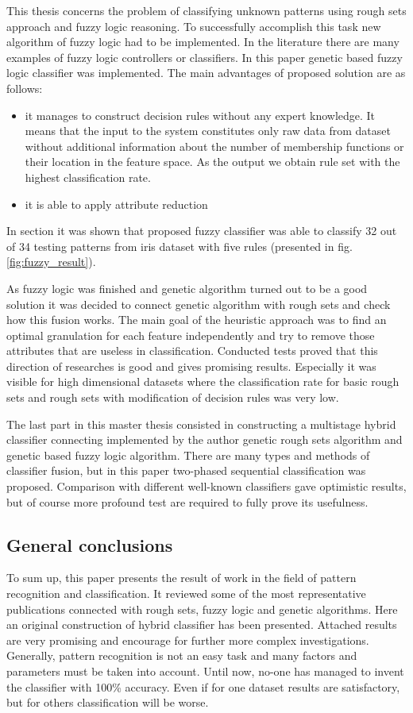 This thesis concerns the problem of classifying unknown patterns using rough
sets approach and fuzzy logic reasoning. To successfully accomplish this task
new algorithm of fuzzy logic had to be implemented. In the literature there are
many examples of fuzzy logic controllers or classifiers. In this paper genetic
based fuzzy logic classifier was implemented. The main advantages of proposed
solution are as follows:
\begin{itemize}
    \item it manages to construct decision rules without any expert knowledge.
        It means that the input to the system constitutes only raw data from
        dataset without additional information about the number of membership
        functions or their location in the feature space. As the output we
        obtain rule set with the highest classification rate. 
    \item it is able to apply attribute reduction
\end{itemize}
In section \label{cha:Simulation_reaearch_3} it was shown that proposed fuzzy
classifier was able to classify 32 out of 34 testing patterns from iris dataset
with  five rules (presented in fig. \ref{fig:fuzzy_result}).

As fuzzy logic was finished and genetic algorithm turned out to be a good
solution it was decided to connect genetic algorithm with rough sets and check
how this fusion works. The main goal of the heuristic approach was to find an
optimal granulation for each feature independently and try to remove those
attributes that are useless in classification. Conducted tests proved that
this direction of researches is good and gives promising results. Especially it
was visible for high dimensional datasets where the classification rate for
basic rough sets and rough sets with modification of decision rules was very
low. 

The last part in this master thesis consisted in constructing a multistage 
hybrid classifier connecting implemented by the author genetic rough sets
algorithm and genetic based fuzzy logic algorithm. There are many types and
methods of classifier fusion, but in this paper two-phased sequential
classification was proposed. Comparison with different well-known classifiers
gave optimistic results, but of course more profound test are required to fully
prove its usefulness.
\subsection{General conclusions} 
To sum up, this paper presents the result of work in the field of pattern
recognition and classification. It reviewed some of the most representative 
publications connected with rough sets, fuzzy logic and genetic algorithms.
Here an original construction of hybrid classifier has been presented. Attached
results are very promising and encourage for further more complex
investigations. Generally, pattern recognition is not an easy task and many
factors and parameters must be taken into account. Until now, no-one has
managed to invent the classifier with 100\% accuracy. Even if for one dataset
results are satisfactory, but for others classification will be worse.
